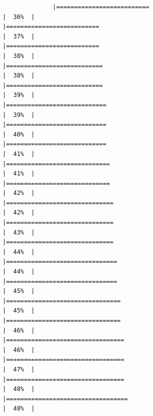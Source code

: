 \documentclass[
]{article}
\begin{document}
\begin{verbatim}
              |==========================                                            |  36%  |                                                                              |==========================                                            |  37%  |                                                                              |==========================                                            |  38%  |                                                                              |===========================                                           |  38%  |                                                                              |===========================                                           |  39%  |                                                                              |============================                                          |  39%  |                                                                              |============================                                          |  40%  |                                                                              |============================                                          |  41%  |                                                                              |=============================                                         |  41%  |                                                                              |=============================                                         |  42%  |                                                                              |==============================                                        |  42%  |                                                                              |==============================                                        |  43%  |                                                                              |==============================                                        |  44%  |                                                                              |===============================                                       |  44%  |                                                                              |===============================                                       |  45%  |                                                                              |================================                                      |  45%  |                                                                              |================================                                      |  46%  |                                                                              |=================================                                     |  46%  |                                                                              |=================================                                     |  47%  |                                                                              |=================================                                     |  48%  |                                                                              |==================================                                    |  48%  |                                                                 
\end{verbatim}
\end{document}
